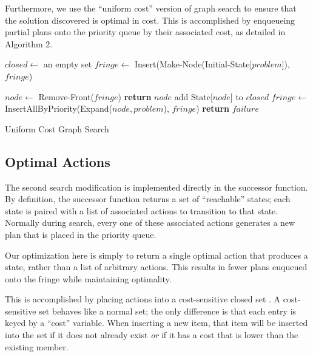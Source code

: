 Furthermore, we use the ``uniform cost'' version of graph search \cite{AIBook} to ensure that the solution discovered is optimal in cost. This is accomplished by enqueueing partial plans onto the priority queue by their associated cost, as detailed in Algorithm 2.

\begin{algorithm}[H]\label{graphSearch}
\begin{algorithmic}[1]
	\State $closed \gets$ an empty set
	\State $fringe \gets$ Insert(Make-Node(Initial-State[$problem$]),$fringe$)

		\State $node \gets$ Remove-Front($fringe$)
			\State \textbf{return} $node$ 
		\EndIf
			\State add State[$node$] to $closed$
			\State $fringe \gets$ InsertAllByPriority(Expand($node, problem$), $fringe$)
		\EndIf
	\EndWhile
	\State \textbf{return} $failure$ 

\EndFunction

\end{algorithmic}
\caption{Uniform Cost Graph Search}
\end{algorithm}

	\subsection{Optimal Actions}

The second search modification is implemented directly in the successor function. By definition, the successor function returns a set of ``reachable'' states; each state is paired with a list of associated actions to transition to that state. Normally during search, every one of these associated actions generates a new plan that is placed in the priority queue.

Our optimization here is simply to return a single optimal action that produces a state, rather than a list of arbitrary actions. This results in fewer plans enqueued onto the fringe while maintaining optimality.

This is accomplished by placing actions into a cost-sensitive closed set \cite{AIBook}. A cost-sensitive set behaves like a normal set; the only difference is that each entry is keyed by a ``cost'' variable. When inserting a new item, that item will be inserted into the set if it does not already exist \emph{or} if it has a cost that is lower than the existing member.

